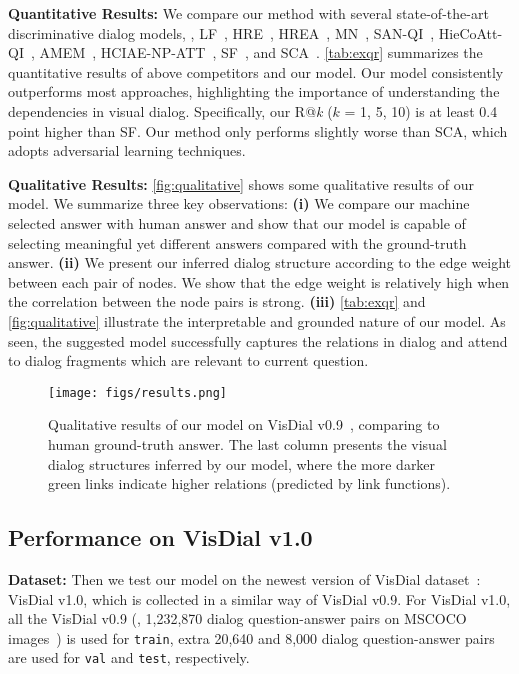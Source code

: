 \documentclass[10pt,twocolumn,letterpaper]{article}
\begin{document}
\noindent\textbf{Quantitative Results:} We compare our method with several state-of-the-art discriminative dialog models, \ie, LF~\cite{das2017visual}, HRE~\cite{das2017visual}, HREA~\cite{das2017visual}, MN~\cite{das2017visual}, SAN-QI~\cite{yang2016stacked}, HieCoAtt-QI~\cite{lu2016hierarchical}, AMEM~\cite{seo2017visual}, HCIAE-NP-ATT~\cite{lu2017best}, SF~\cite{jain2018two}, and SCA~\cite{Wu_2018_CVPR}. \autoref{tab:exqr} summarizes the quantitative results of above competitors and our model. Our model consistently outperforms most approaches, highlighting the importance of understanding the dependencies in visual dialog. Specifically, our R@\textit{k}
($k$ = 1, 5, 10) is at least 0.4 point higher than SF. Our method only performs slightly worse than SCA, which adopts adversarial learning techniques.





\noindent\textbf{Qualitative Results:} \autoref{fig:qualitative} shows some qualitative results of our model. We summarize three key observations: \textbf{(i)} We compare our machine selected answer with human answer and show that our model is capable of selecting meaningful yet different answers compared with the ground-truth answer.
\textbf{(ii)} We present our inferred dialog structure according to the edge weight between each pair of nodes. We show that the edge weight is relatively high when the correlation between the node pairs is strong.
\textbf{(iii)} \autoref{tab:exqr} and \autoref{fig:qualitative}
illustrate the interpretable and grounded nature of our model. As seen, the suggested model successfully captures the relations in dialog and attend to dialog fragments which are relevant to current question.

\begin{figure*}[ht]
\centering
      \texttt{[image: figs/results.png]}
\caption{\small Qualitative results of our model on VisDial v0.9~\cite{das2017visual}, comparing to human ground-truth answer. The last column presents the visual dialog structures inferred by our model, where the more darker green links indicate higher relations (predicted by link functions). }
\label{fig:qualitative}
\vspace{-12pt}
\end{figure*}

\vspace{-3pt}
\subsection{Performance on VisDial v1.0~\cite{das2017visual}}\label{sec:vdv1}
\vspace{-1pt}
\noindent\textbf{Dataset:} Then we test our model on the newest version of VisDial dataset~\cite{das2017visual}: VisDial v1.0, which is collected in a similar way of VisDial v0.9. For VisDial v1.0, all the VisDial v0.9 (\ie, 1,232,870 dialog question-answer pairs on MSCOCO images~\cite{lin2014microsoft}) is used for \verb"train", extra 20,640 and 8,000 dialog question-answer pairs are used for \verb"val" and \verb"test", respectively.
\end{document}
